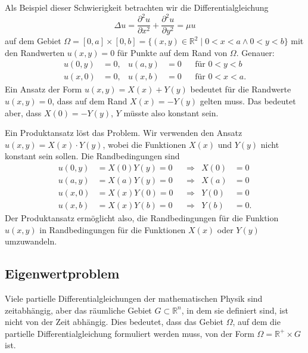 Als Beispiel dieser Schwierigkeit betrachten wir die Differentialgleichung
\[
\Delta u
=
\frac{\partial^2 u}{\partial x^2}
+
\frac{\partial^2 u}{\partial y^2}
=
\mu u
\]
auf dem Gebiet
$\Omega = [0,a]\times [0,b] = \{(x,y)\in\mathbb{R}^2\mid 0<x<a\wedge 0<y<b\}$
mit den Randwerten $u(x,y)=0$ für Punkte auf dem Rand von $\Omega$.
Genauer:
\[
\begin{aligned}
u(0,y) &= 0,& u(a,y) &= 0&&\text{für $0<y<b$} \\
u(x,0) &= 0,& u(x,b) &= 0&&\text{für $0<x<a$}.
\end{aligned}
\]
Ein Ansatz der Form $u(x,y)=X(x) + Y(y)$ bedeutet für die
Randwerte $u(x,y)=0$, dass auf dem Rand $X(x)=-Y(y)$ gelten muss.
Das bedeutet aber, dass $X(0) = -Y(y)$, $Y$ müsste also konstant
sein.

Ein Produktansatz löst das Problem.
Wir verwenden den Ansatz
$u(x,y) = X(x)\cdot Y(y)$, wobei die Funktionen $X(x)$ und $Y(y)$
nicht konstant sein sollen.
Die Randbedingungen sind
\[
\begin{aligned}
u(0,y) &= X(0) Y(y) = 0&&\Rightarrow& X(0)&=0\\
u(a,y) &= X(a) Y(y) = 0&&\Rightarrow& X(a)&=0\\
u(x,0) &= X(x) Y(0) = 0&&\Rightarrow& Y(0)&=0\\
u(x,b) &= X(x) Y(b) = 0&&\Rightarrow& Y(b)&=0.
\end{aligned}
\]
Der Produktansatz ermöglicht also, die Randbedingungen für die Funktion
$u(x,y)$ in Randbedingungen für die Funktionen $X(x)$ oder $Y(y)$
umzuwandeln.

%
%
\subsection{Eigenwertproblem
\label{buch:pde:subsection:eigenwertproblem}}
Viele partielle Differentialgleichungen der mathematischen Physik
sind zeitabhängig, aber das räumliche Gebiet $G\subset\mathbb{R}^n$,
in dem sie definiert sind, ist nicht von der Zeit abhängig.
Dies bedeutet, dass das Gebiet $\Omega$, auf dem die partielle
Differentialgleichung formuliert werden muss, von der Form
\(
\Omega
=
\mathbb{R}^+
\times 
G
\)
ist.

%
%
